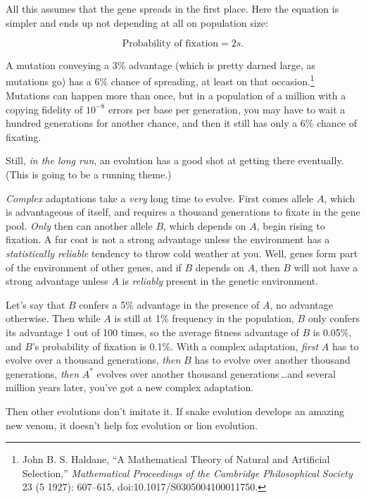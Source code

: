 {{
 All this assumes that the gene spreads in the first place. Here
the equation is simpler and ends up not depending at all on population
size:}

\begin{equation*}
\text{Probability of fixation} = 2s.
\end{equation*}


{
 A mutation conveying a 3\% advantage (which is pretty darned
large, as mutations go) has a 6\% chance of spreading, at least on that
occasion.\footnote{John B. S. Haldane, ``A Mathematical Theory of
Natural and Artificial Selection,''
\textit{Mathematical Proceedings of the Cambridge Philosophical
Society} 23 (5 1927): 607--615, doi:10.1017/S0305004100011750.} Mutations can happen more than once, but
in a population of a million with a copying fidelity of
$10^{-8}$ errors per base per generation, you may have
to wait a hundred generations for another chance, and then it still has
only a 6\% chance of fixating. }

{
 Still, \textit{in the long run}, an evolution has a good shot at
getting there eventually. (This is going to be a running theme.)}

{
 \textit{Complex} adaptations take a \textit{very} long time to
evolve. First comes allele $A$, which is advantageous of itself, and
requires a thousand generations to fixate in the gene pool.
\textit{Only} then can another allele $B$, which depends on $A$, begin
rising to fixation. A fur coat is not a strong advantage unless the
environment has a \textit{statistically reliable} tendency to throw
cold weather at you. Well, genes form part of the environment of other
genes, and if $B$ depends on $A$, then $B$ will not have a strong advantage
unless $A$ is \textit{reliably} present in the genetic environment.}

{
 Let's say that $B$ confers a 5\% advantage in the
presence of $A$, no advantage otherwise. Then while $A$ is still at 1\%
frequency in the population, $B$ only confers its advantage 1 out of 100
times, so the average fitness advantage of $B$ is 0.05\%, and
$B$'s probability of fixation is 0.1\%. With a complex
adaptation, \textit{first} $A$ has to evolve over a thousand generations,
\textit{then} $B$ has to evolve over another thousand generations,
\textit{then} $A^{*}$ evolves over another thousand
generations\,\ldots and several million years later,
you've got a new complex adaptation.}

{
 Then other evolutions don't imitate it. If snake
evolution develops an amazing new venom, it doesn't
help fox evolution or lion evolution.}

}
